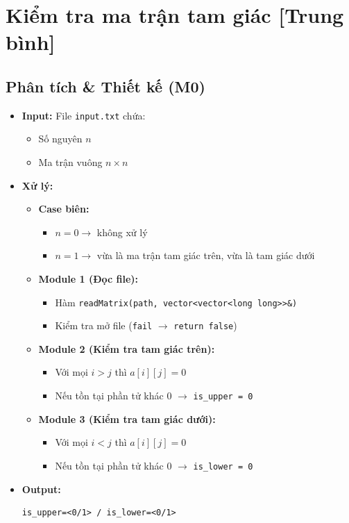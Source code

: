 \section{Kiểm tra ma trận tam giác [Trung bình]}
\subsection{Phân tích \& Thiết kế (M0)}
\begin{itemize}
    \item \textbf{Input:}
    File \texttt{input.txt} chứa:
    \begin{itemize}
        \item Số nguyên $n$
        \item Ma trận vuông $n \times n$
    \end{itemize}

    \item \textbf{Xử lý:}
    \begin{itemize}
        \item \textbf{Case biên:}
        \begin{itemize}
            \item $n = 0 \rightarrow$ không xử lý
            \item $n = 1 \rightarrow$ vừa là ma trận tam giác trên, vừa là tam giác dưới
        \end{itemize}

        \item \textbf{Module 1 (Đọc file):}
        \begin{itemize}
            \item Hàm \texttt{readMatrix(path, vector<vector<long long>>\&)}
            \item Kiểm tra mở file (\texttt{fail} $\rightarrow$ \texttt{return false})
        \end{itemize}

        \item \textbf{Module 2 (Kiểm tra tam giác trên):}
        \begin{itemize}
            \item Với mọi $i > j$ thì $a[i][j] = 0$
            \item Nếu tồn tại phần tử khác 0 $\rightarrow$ \texttt{is\_upper = 0}
        \end{itemize}

        \item \textbf{Module 3 (Kiểm tra tam giác dưới):}
        \begin{itemize}
            \item Với mọi $i < j$ thì $a[i][j] = 0$
            \item Nếu tồn tại phần tử khác 0 $\rightarrow$ \texttt{is\_lower = 0}
        \end{itemize}
    \end{itemize}

    \item \textbf{Output:}
    \begin{lstlisting}
is_upper=<0/1> / is_lower=<0/1>
    \end{lstlisting}
\end{itemize}

